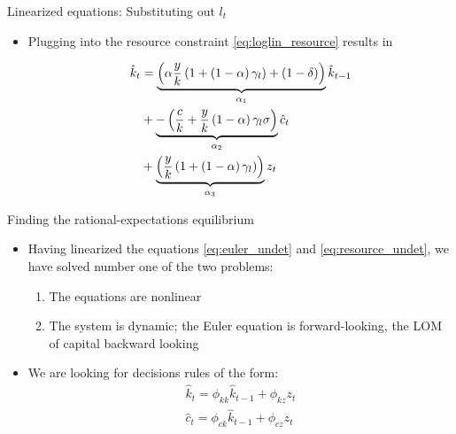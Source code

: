 \documentclass[handout,usepdftitle=false,xcolor=dvipsnames,aspectratio=169]{beamer}
\begin{document}
\begin{frame}{Linearized equations: Substituting out $l_t$}
\begin{itemize}
\item Plugging into the resource constraint \eqref{eq:loglin_resource} results in
\begin{small}
\begin{align}
  {{\hat k}_{t}} &= \underbrace {\left( {\alpha \frac{y}{k}\left( {1 + \left( {1 - \alpha } \right)\gamma_l } \right) + \left( {1 - \delta } \right)} \right)}_{{\alpha _1}}{{\hat k}_{t-1}} \notag \\
   &+ \underbrace { - \left( {\frac{c}{{k}} + \frac{y}{{k}}\left( {1 - \alpha } \right)\gamma_l \sigma } \right)}_{{\alpha _2}}{{\hat c}_t} \notag \\
   &+ \underbrace {\left( {\frac{y}{{k}}\left( {1 + \left( {1 - \alpha } \right)\gamma_l } \right)} \right)}_{{\alpha _3}}{z_t} \label{eq:resource_undet}
\end{align}
\end{small}
\end{itemize}
\end{frame}

\renewcommand{\Source}{}


\begin{frame}{Finding the rational-expectations equilibrium}
\begin{itemize}
\item Having linearized the equations \eqref{eq:euler_undet} and \eqref{eq:resource_undet}, we have solved number one of the two problems:
\begin{enumerate}
   \item The equations are nonlinear
    \item The system is dynamic; the Euler equation is forward-looking, the LOM of capital backward looking
\end{enumerate}
\item We are looking for decisions rules of the form:
\begin{align}
  {{\hat k}_{t}} = {\phi _{kk}}{{\hat k}_{t-1}} + {\phi _{kz}}{z_t} \label{eq:RBCphikkLOM} \\
  {{\hat c}_t} = {\phi _{ck}}{{\hat k}_{t-1}} + {\phi _{cz}}{z_t} \label{eq:RBCphickLOM}
\end{align}

\end{itemize}
\end{frame}
\end{document}

